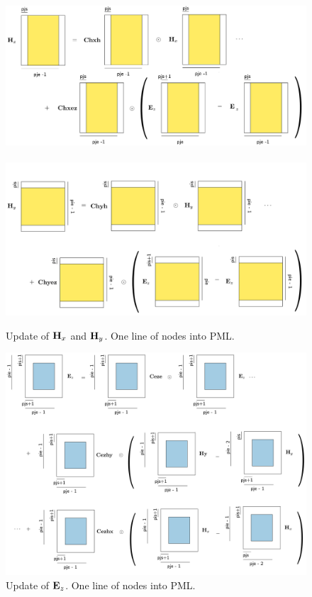\documentclass[a4paper,12pt]{article}
\begin{document}
\begin{figure}
\centering
\includegraphics[width=1\textwidth]{../pics/tikz/svg/Hx-new-inside.pdf}
~
\includegraphics[width=1\textwidth]{../pics/tikz/svg/Hy-new-inside.pdf}
\caption{Update of ${\bf H}_x$ and ${\bf H}_y$. One line of nodes into PML.}
\end{figure}
%
\begin{figure}
\centering
\includegraphics[width=1\textwidth]{../pics/tikz/svg/Ez-new-inside.pdf}
\caption{Update of ${\bf E}_z$. One line of nodes into PML.}
\end{figure}
\end{document}
